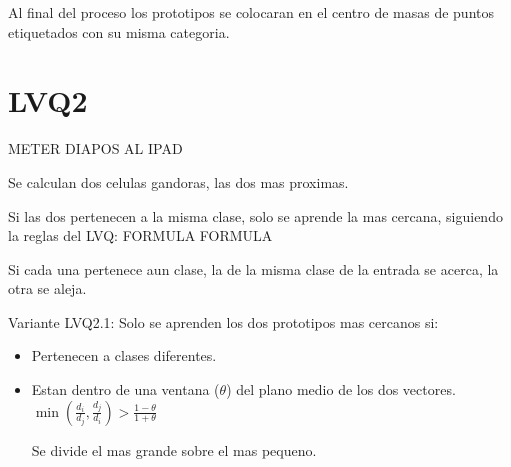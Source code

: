 \documentclass[12pt, twoside, openright]{report} %
\begin{document}
Al final del proceso los prototipos se colocaran en el centro de masas de puntos etiquetados con su misma categoria.

\section{LVQ2}
METER DIAPOS AL IPAD

Se calculan dos celulas gandoras, las dos mas proximas.

Si las dos pertenecen a la misma clase, solo se aprende la mas cercana, siguiendo la reglas del LVQ:
	FORMULA
	FORMULA
	
Si cada una pertenece aun clase, la de la misma clase de la entrada se acerca, la otra se aleja.

Variante LVQ2.1: Solo se aprenden los dos prototipos mas cercanos si:
\begin{itemize}
	\item Pertenecen a clases diferentes.
	\item Estan dentro de una ventana ($\theta$) del plano medio de los dos vectores.
	$\min \left(\frac{d_i}{d_j}, \frac{d_j}{d_i} \right) > \frac{1-\theta}{1+\theta}$
	
	Se divide el mas grande sobre el mas pequeno.
\end{itemize}
\end{document}
